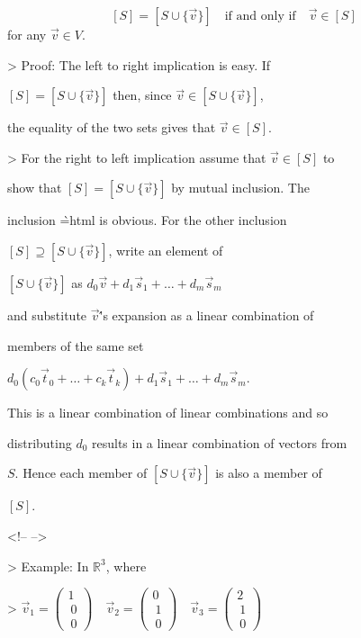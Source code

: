 $$[S]=[S\cup\{\vec{v}\}]

\quad\text{if and only if}\quad

\vec{v}\in[S]$$ for any $\vec{v}\in V$.



>   Proof: The left to right implication is easy. If

    $[S]=[S\cup\{\vec{v}\}]$ then, since $\vec{v}\in[S\cup\{\vec{v}\}]$,

    the equality of the two sets gives that $\vec{v}\in[S]$.

>   For the right to left implication assume that $\vec{v}\in [S]$ to

    show that $[S]=[S\cup\{\vec{v}\}]$ by mutual inclusion. The

    inclusion \`{=html} is obvious. For the other inclusion

    $[S]\supseteq[S\cup\{\vec{v}\}]$, write an element of

    $[S\cup\{\vec{v}\}]$ as $d_0\vec{v}+d_1\vec{s}_1+\dots+d_m\vec{s}_m$

    and substitute $\vec{v}$\''s expansion as a linear combination of

    members of the same set

    $d_0(c_0\vec{t}_0+\dots+c_k\vec{t}_k)+d_1\vec{s}_1+\dots+d_m\vec{s}_m$.

    This is a linear combination of linear combinations and so

    distributing $d_0$ results in a linear combination of vectors from

    $S$. Hence each member of $[S\cup\{\vec{v}\}]$ is also a member of

    $[S]$.



<!-- -->



>   Example: In $\mathbb{R}^3$, where



    >   $\vec{v}_1=\begin{pmatrix} 1 \\\     0 \\\     0 \end{pmatrix}\quad

        \vec{v}_2=\begin{pmatrix} 0 \\\         1 \\\         0 \end{pmatrix}\quad

        \vec{v}_3=\begin{pmatrix} 2 \\\         1 \\\         0 \end{pmatrix}$



